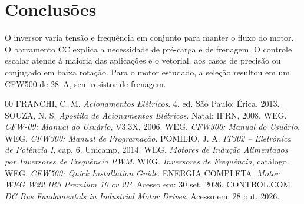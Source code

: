 \documentclass[conference]{IEEEtran}
\begin{document}
\section{Conclusões}

O inversor varia tensão e frequência em conjunto para manter o fluxo do motor. O barramento CC explica a necessidade de pré-carga e de frenagem. O controle escalar atende à maioria das aplicações e o vetorial, aos casos de precisão ou conjugado em baixa rotação. Para o motor estudado, a seleção resultou em um CFW500 de 28~A, sem resistor de frenagem.

\begin{thebibliography}{00}
 FRANCHI, C. M. \textit{Acionamentos Elétricos}. 4. ed. São Paulo: Érica, 2013.
 SOUZA, N. S. \textit{Apostila de Acionamentos Elétricos}. Natal: IFRN, 2008.
 WEG. \textit{CFW-09: Manual do Usuário}, V3.3X, 2006.
 WEG. \textit{CFW300: Manual do Usuário}.
 WEG. \textit{CFW300: Manual de Programação}.
 POMILIO, J. A. \textit{IT302 -- Eletrônica de Potência I}, cap. 6. Unicamp, 2014.
 WEG. \textit{Motores de Indução Alimentados por Inversores de Frequência PWM}.
 WEG. \textit{Inversores de Frequência}, catálogo.
 WEG. \textit{CFW500: Quick Installation Guide}.
 ENERGIA COMPLETA. \textit{Motor WEG W22 IR3 Premium 10 cv 2P}. Acesso em: 30 set. 2026.
 CONTROL.COM. \textit{DC Bus Fundamentals in Industrial Motor Drives}. Acesso em: 28 out. 2026.
\end{thebibliography}
\end{document}

